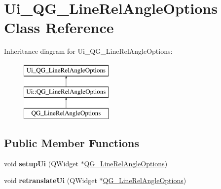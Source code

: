 \hypertarget{classUi__QG__LineRelAngleOptions}{\section{Ui\-\_\-\-Q\-G\-\_\-\-Line\-Rel\-Angle\-Options Class Reference}
\label{classUi__QG__LineRelAngleOptions}
}
Inheritance diagram for Ui\-\_\-\-Q\-G\-\_\-\-Line\-Rel\-Angle\-Options\-:\begin{figure}[H]
\begin{center}
\leavevmode
\includegraphics[height=3.000000cm]{classUi__QG__LineRelAngleOptions}
\end{center}
\end{figure}
\subsection*{Public Member Functions}
\begin{DoxyCompactItemize}
\item 
\hypertarget{classUi__QG__LineRelAngleOptions_aa12ac0b41c47ed84a4bb55b8cb364041}{void {\bfseries setup\-Ui} (Q\-Widget $\ast$\hyperlink{classQG__LineRelAngleOptions}{Q\-G\-\_\-\-Line\-Rel\-Angle\-Options})}\label{classUi__QG__LineRelAngleOptions_aa12ac0b41c47ed84a4bb55b8cb364041}

\item 
\hypertarget{classUi__QG__LineRelAngleOptions_a0ddbe74da17af6453bf90d1323db652a}{void {\bfseries retranslate\-Ui} (Q\-Widget $\ast$\hyperlink{classQG__LineRelAngleOptions}{Q\-G\-\_\-\-Line\-Rel\-Angle\-Options})}\label{classUi__QG__LineRelAngleOptions_a0ddbe74da17af6453bf90d1323db652a}

\end{DoxyCompactItemize}
